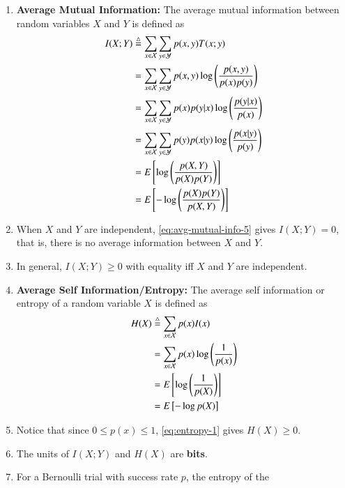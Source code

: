 \documentclass[journal,12pt,twocolumn]{IEEEtran}
\renewcommand\thesection{\arabic{section}}
\begin{document}
\begin{enumerate}[label=\thesection.\arabic*, ref=\thesection.\theenumi]
    \item \textbf{Average Mutual Information:} The average mutual information
    between random variables $X$ and $Y$ is defined as
    \begin{align}
        I(X;Y) &\stackrel{\triangle}{=} \sum_{x\in\mathcal{X}}\sum_{y\in\mathcal{Y}}p(x,y)T(x;y) \label{eq:avg-mutual-info-1} \\
        &= \sum_{x\in\mathcal{X}}\sum_{y\in\mathcal{Y}}p(x,y)\log\left(\frac{p(x,y)}{p(x)p(y)}\right) \label{eq:avg-mutual-info-2} \\
        &= \sum_{x\in\mathcal{X}}\sum_{y\in\mathcal{Y}}p(x)p(y|x)\log\left(\frac{p(y|x)}{p(x)}\right) \label{eq:avg-mutual-info-3} \\
        &= \sum_{x\in\mathcal{X}}\sum_{y\in\mathcal{Y}}p(y)p(x|y)\log\left(\frac{p(x|y)}{p(y)}\right) \label{eq:avg-mutual-info-4} \\
        &= E{}\left[\log\left(\frac{p(X,Y)}{p(X)p(Y)}\right)\right] \label{eq:avg-mutual-info-5} \\
        &= E{}\left[-\log\left(\frac{p(X)p(Y)}{p(X,Y)}\right)\right] \label{eq:avg-mutual-info-6}
    \end{align}
    \item When $X$ and $Y$ are independent, \eqref{eq:avg-mutual-info-5} gives 
    $I(X;Y) = 0$, that is, there is no average information between $X$ and $Y$.
    \item In general, $I(X;Y) \ge 0$ with equality iff $X$ and $Y$ are independent.
    \item \textbf{Average Self Information/Entropy:} The average self information 
    or entropy of a random variable $X$ is defined as
    \begin{align}
        H(X) &\stackrel{\triangle}{=} \sum_{x\in\mathcal{X}}p(x)I(x) \label{eq:entropy-1} \\
        &= \sum_{x\in\mathcal{X}}p(x)\log\left(\frac{1}{p(x)}\right) \label{eq:entropy-2} \\
        &= E{}\left[\log\left(\frac{1}{p(X)}\right)\right] \label{eq:entropy-3} \\
        &= E{}\left[-\log p(X)\right] \label{eq:entropy-4}
    \end{align}
    \item Notice that since $0 \le p(x) \le 1$, \eqref{eq:entropy-1} gives 
    $H(X) \ge 0$.
    \item The units of $I(X;Y)$ and $H(X)$ are \textbf{bits}.
    \item For a Bernoulli trial with success rate $p$, the entropy of the

\end{enumerate}
\end{document}
